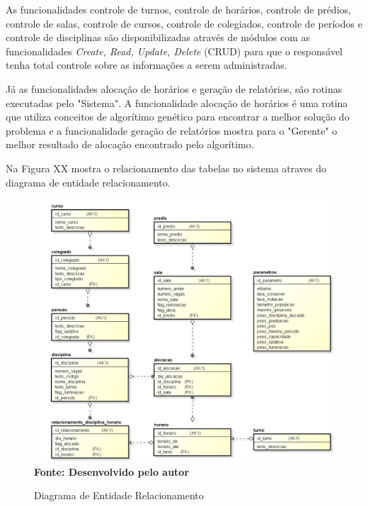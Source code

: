 As funcionalidades controle de turnos, controle de horários, controle de prédios, controle de salas, controle de cursos, controle de colegiados, controle de períodos e controle de disciplinas são disponibilizadas através de módulos com as funcionalidades \textit{Create, Read, Update, Delete} (CRUD) para que o responsável tenha total controle sobre as informações a serem administradas.\par

Já as funcionalidades alocação de horários e geração de relatórios, são rotinas executadas pelo "Sistema". A funcionalidade alocação de horários é uma rotina que utiliza conceitos de algorítimo genético para encontrar a melhor solução do problema e a funcionalidade geração de relatórios mostra para o "Gerente" o melhor resultado de alocação encontrado pelo algorítimo.\par


Na Figura XX mostra o relacionamento das tabelas no sistema atraves do diagrama de entidade relacionamento.\par

\begin{figure}[!htb]
\caption[Diagrama de Entidade Relacionamento]{Diagrama de Entidade Relacionamento}
\label{fig:figura2}
\centering
\includegraphics[scale=0.5]{imagens/diagramaEntidadeRelacionamento.png}
\\ \textbf{\footnotesize Fonte: Desenvolvido pelo autor}
\end{figure}

